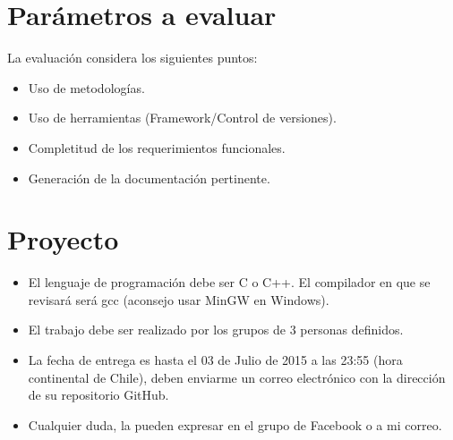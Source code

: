 \documentclass[a4paper,10pt]{article}
\begin{document}
\section{Parámetros a evaluar}

La evaluación considera los siguientes puntos:

\begin{itemize}
  \item Uso de metodologías.
  \item Uso de herramientas (Framework/Control de versiones).
  \item Completitud de los requerimientos funcionales.
  \item Generación de la documentación pertinente.
\end{itemize}


\section{Proyecto}

\begin{itemize}
 \item El lenguaje de programación debe ser C o C++. El compilador en que se revisará será gcc (aconsejo usar MinGW en Windows).
 \item El trabajo debe ser realizado por los grupos de 3 personas definidos.
 \item La fecha de entrega es hasta el 03 de Julio de 2015 a las 23:55 (hora continental de Chile), deben enviarme un correo electrónico con la dirección de su repositorio GitHub.
 \item Cualquier duda, la pueden expresar en el grupo de Facebook o a mi correo.
\end{itemize}
    
\end{document}
